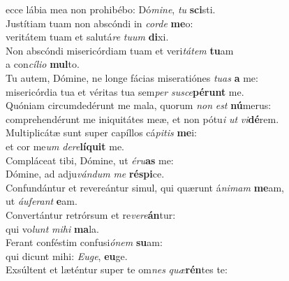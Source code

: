 \evenverse ecce lábia mea non prohibébo: Dó\textit{mi}\textit{ne}, \textit{tu} \textbf{sci}sti.\\
\oddverse Justítiam tuam non abscóndi in \textit{cor}\textit{de} \textbf{me}o:~\*\\
\oddverse veritátem tuam et salutá\textit{re} \textit{tu}\textit{um} \textbf{di}xi.\\
\evenverse Non abscóndi misericórdiam tuam et veri\textit{tá}\textit{tem} \textbf{tu}am~\*\\
\evenverse a con\textit{cí}\textit{li}\textit{o} \textbf{mul}to.\\
\oddverse Tu autem, Dómine, ne longe fácias miseratiónes \textit{tu}\textit{as} \textbf{a} me:~\*\\
\oddverse misericórdia tua et véritas tua sem\textit{per} \textit{su}\textit{sce}\textbf{pé}\textbf{runt} me.\\
\evenverse Quóniam circumdedérunt me mala, quorum \textit{non} \textit{est} \textbf{nú}merus:~\*\\
\evenverse comprehendérunt me iniquitátes meæ, et non pótu\textit{i} \textit{ut} \textit{vi}\textbf{dé}rem.\\
\oddverse Multiplicátæ sunt super capíllos cá\textit{pi}\textit{tis} \textbf{me}i:~\*\\
\oddverse et cor me\textit{um} \textit{de}\textit{re}\textbf{lí}\textbf{quit} me.\\
\evenverse Compláceat tibi, Dómine, ut \textit{é}\textit{ru}\textbf{as} me:~\*\\
\evenverse Dómine, ad adju\textit{ván}\textit{dum} \textit{me} \textbf{ré}\textbf{spi}ce.\\
\oddverse Confundántur et revereántur simul, qui quærunt á\textit{ni}\textit{mam} \textbf{me}am,~\*\\
\oddverse ut \textit{áu}\textit{fe}\textit{rant} \textbf{e}am.\\
\evenverse Convertántur retrórsum et re\textit{ve}\textit{re}\textbf{án}tur:~\*\\
\evenverse qui vo\textit{lunt} \textit{mi}\textit{hi} \textbf{ma}la.\\
\oddverse Ferant conféstim confusi\textit{ó}\textit{nem} \textbf{su}am:~\*\\
\oddverse qui dicunt mihi: \textit{E}\textit{u}\textit{ge}, \textbf{e}\textbf{u}ge.\\
\evenverse Exsúltent et læténtur super te om\textit{nes} \textit{quæ}\textbf{rén}tes te:~\*\\
